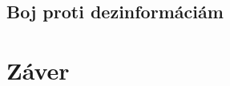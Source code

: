 \documentclass[10pt,twoside,slovak,a4paper]{article}
\begin{document}
\subsection{Boj proti dezinformáciám}














\section{Záver} \label{zaver} %






\end{document}
